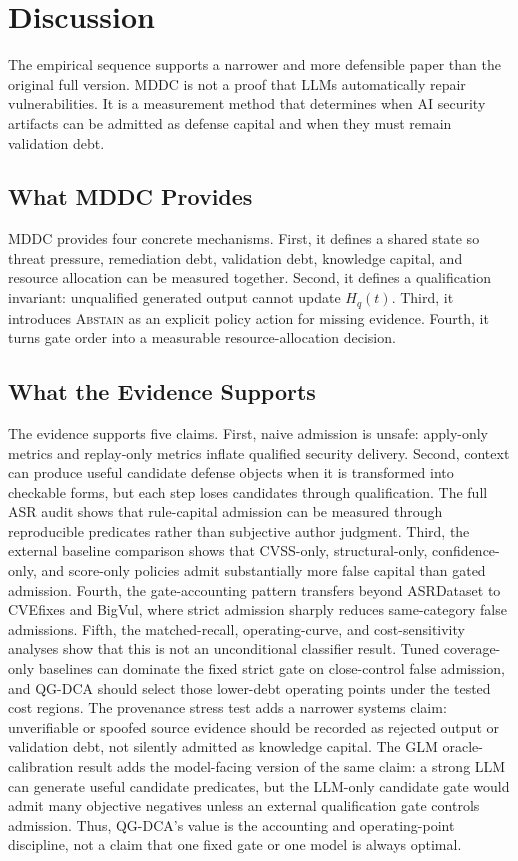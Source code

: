 ﻿\documentclass[lettersize,journal]{IEEEtran}
\begin{document}
\section{Discussion}
The empirical sequence supports a narrower and more defensible paper than the original full version. MDDC is not a proof that LLMs automatically repair vulnerabilities. It is a measurement method that determines when AI security artifacts can be admitted as defense capital and when they must remain validation debt.

\subsection{What MDDC Provides}
MDDC provides four concrete mechanisms. First, it defines a shared state so threat pressure, remediation debt, validation debt, knowledge capital, and resource allocation can be measured together. Second, it defines a qualification invariant: unqualified generated output cannot update $H_q(t)$. Third, it introduces \textsc{Abstain} as an explicit policy action for missing evidence. Fourth, it turns gate order into a measurable resource-allocation decision.

\subsection{What the Evidence Supports}
The evidence supports five claims. First, naive admission is unsafe: apply-only metrics and replay-only metrics inflate qualified security delivery. Second, context can produce useful candidate defense objects when it is transformed into checkable forms, but each step loses candidates through qualification. The full ASR audit shows that rule-capital admission can be measured through reproducible predicates rather than subjective author judgment. Third, the external baseline comparison shows that CVSS-only, structural-only, confidence-only, and score-only policies admit substantially more false capital than gated admission. Fourth, the gate-accounting pattern transfers beyond ASRDataset to CVEfixes and BigVul, where strict admission sharply reduces same-category false admissions. Fifth, the matched-recall, operating-curve, and cost-sensitivity analyses show that this is not an unconditional classifier result. Tuned coverage-only baselines can dominate the fixed strict gate on close-control false admission, and QG-DCA should select those lower-debt operating points under the tested cost regions. The provenance stress test adds a narrower systems claim: unverifiable or spoofed source evidence should be recorded as rejected output or validation debt, not silently admitted as knowledge capital. The GLM oracle-calibration result adds the model-facing version of the same claim: a strong LLM can generate useful candidate predicates, but the LLM-only candidate gate would admit many objective negatives unless an external qualification gate controls admission. Thus, QG-DCA's value is the accounting and operating-point discipline, not a claim that one fixed gate or one model is always optimal.
\end{document}
